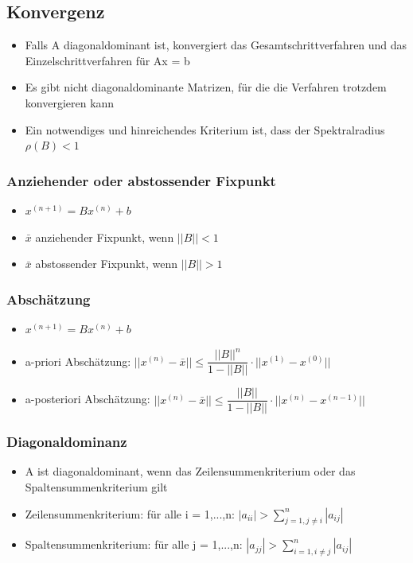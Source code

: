 \documentclass[8pt,a4paper]{scrartcl}
\begin{document}
\begin{multicols*}{3}
			\subsection{Konvergenz}
				\begin{itemize}\itemsep0pt	
					\item Falls A diagonaldominant ist, konvergiert das Gesamtschrittverfahren und das Einzelschrittverfahren für Ax = b	
					\item Es gibt nicht diagonaldominante Matrizen, für die die Verfahren trotzdem konvergieren kann
					\item Ein notwendiges und hinreichendes Kriterium ist, dass der Spektralradius $\rho(B) < 1$
				\end{itemize}			
			
				\subsubsection{Anziehender oder abstossender Fixpunkt}
					\begin{itemize}\itemsep0pt	
						\item $x^{(n+1)} = Bx^{(n)} + b$
						\item $\bar{x}$ anziehender Fixpunkt, wenn $||B||<1$
						\item $\bar{x}$ abstossender Fixpunkt, wenn $||B||>1$
					\end{itemize}
					
				\subsubsection{Abschätzung}
					\begin{itemize}\itemsep0pt	
						\item $x^{(n+1)} = Bx^{(n)} + b$
						\item a-priori Abschätzung: $||x^{(n)} - \bar{x}|| \leq \dfrac{||B||^{n}}{1-||B||}\cdot ||x^{(1)}-x^{(0)}||$ 
						\item a-posteriori Abschätzung: $||x^{(n)} - \bar{x}|| \leq \dfrac{||B||}{1-||B||}\cdot ||x^{(n)}-x^{(n-1)}||$ 
					\end{itemize}
					
				\subsubsection{Diagonaldominanz}
					\begin{itemize}\itemsep0pt	
						\item A ist diagonaldominant, wenn das Zeilensummenkriterium oder das Spaltensummenkriterium gilt
						\item Zeilensummenkriterium: für alle i = 1,...,n: $|a_{ii}| > \sum_{j=1, j \neq i}^{n}|a_{ij}|$
						\item Spaltensummenkriterium: für alle j = 1,...,n: $|a_{jj}| > \sum_{i=1, i \neq j}^{n}|a_{ij}|$
					\end{itemize}
				

\end{multicols*}
\end{document}
